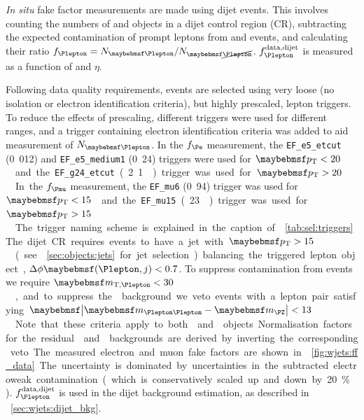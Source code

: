 \textit{In situ} fake factor measurements are made using dijet events. This involves 
counting the numbers of \id{\Plepton} and \antiid{\Plepton} objects in a dijet control 
region (CR), subtracting the expected contamination of prompt leptons from \PW and \PZ 
events, and calculating their ratio $f_{\Plepton}=N_{\id{\Plepton}}/N_{\antiid{\Plepton}}$. 
$f_{\Plepton}^{\text{data,dijet}}$ is measured as a function of \pt and $\eta$.

Following data quality requirements, events are selected using very loose (no isolation 
or electron identification criteria), but highly prescaled, lepton triggers. To reduce 
the effects of prescaling, different triggers were used for different \pt ranges, and a 
trigger containing electron identification criteria was added to aid measurement of 
$N_{\id{\Plepton}}$. 
In the $f_{\Pe}$ measurement, the \verb|EF_e5_etcut| (\unit{0.012}{\invpb}) and 
\verb|EF_e5_medium1| (\unit{0.24}{\invpb}) triggers were used for \unit{$\pt < 20$}{\GeV} 
and the \verb|EF_g24_etcut| (\unit{2.1}{\invpb}) trigger was used for 
\unit{$\pt > 20$}{\GeV}. 
In the $f_{\Pmu}$ measurement, the \verb|EF_mu6| (\unit{0.94}{\invpb}) trigger was used 
for \unit{$\pt < 15$}{\GeV} and the \verb|EF_mu15| (\unit{23}{\invpb}) trigger was used 
for \unit{$\pt > 15$}{\GeV}. The trigger naming scheme is explained in the caption of 
\Table~\ref{tab:sel:triggers}.

The dijet CR requires events to have a jet with \unit{$\pt > 15$}{\GeV} (see 
\Section~\ref{sec:objects:jets} for jet selection) balancing the triggered lepton object,
$\Delta\phi\parenths{\Plepton,j} < 0.7$. To suppress contamination from \PW events we 
require \unit{$\mtw < 30$}{\GeV}, and to suppress the \PZ background we veto events with 
a lepton pair satisfying \unit{$\mods{\mll - \mZ} < 13$}{\GeV}. Note that these 
criteria apply to both \id{\Plepton} and \antiid{\Plepton} objects. Normalisation factors 
for the residual \PW and \PZ backgrounds are derived by inverting the corresponding veto.

The measured electron and muon fake factors are shown in \Figure~\ref{fig:wjets:ff_data}. 
The uncertainty is dominated by uncertainties in the subtracted electroweak contamination 
(which is conservatively scaled up and down by 20\%). $f_{\Plepton}^{\text{data,dijet}}$ is 
used in the dijet background estimation, as described in \Section~\ref{sec:wjets:dijet_bkg}.

